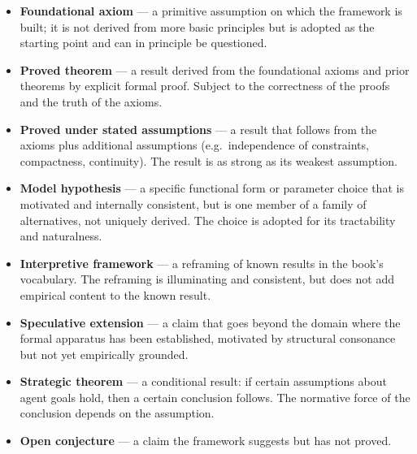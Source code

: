 \documentclass[12pt,twoside,openright]{book}
\begin{document}
\begin{itemize}[nosep]
  \item \textbf{Foundational axiom} --- a primitive
        assumption on which the framework is built; it
        is not derived from more basic principles but
        is adopted as the starting point and can in
        principle be questioned.
  \item \textbf{Proved theorem} --- a result derived
        from the foundational axioms and prior theorems
        by explicit formal proof. Subject to the
        correctness of the proofs and the truth of the
        axioms.
  \item \textbf{Proved under stated assumptions} ---
        a result that follows from the axioms plus
        additional assumptions (e.g.\ independence of
        constraints, compactness, continuity). The
        result is as strong as its weakest assumption.
  \item \textbf{Model hypothesis} --- a specific
        functional form or parameter choice that is
        motivated and internally consistent, but is
        one member of a family of alternatives, not
        uniquely derived. The choice is adopted for
        its tractability and naturalness.
  \item \textbf{Interpretive framework} --- a reframing
        of known results in the book's vocabulary. The
        reframing is illuminating and consistent, but
        does not add empirical content to the known
        result.
  \item \textbf{Speculative extension} --- a claim that
        goes beyond the domain where the formal
        apparatus has been established, motivated by
        structural consonance but not yet empirically
        grounded.
  \item \textbf{Strategic theorem} --- a conditional
        result: if certain assumptions about agent
        goals hold, then a certain conclusion follows.
        The normative force of the conclusion depends
        on the assumption.
  \item \textbf{Open conjecture} --- a claim the
        framework suggests but has not proved.
\end{itemize}
\end{document}
